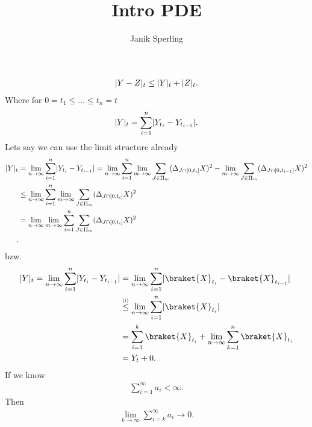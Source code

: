 \documentclass[a4paper]{report}
\title{Intro PDE}
\author{Janik Sperling}
\begin{document}
% 
% 
% 
% 
% 
% 
\begin{align*}
  \lvert Y-Z\rvert_t \le  \lvert Y\rvert_t + \lvert Z\rvert_t
.\end{align*}
Where  for $0 = t_{1}\le \ldots \le t_{n} = t$
\begin{align*}
  \lvert Y\rvert_t = \sum_{i=1}^{n}  \lvert Y_{t_i} - Y_{t_{i-1}}\rvert
.\end{align*}
Lets say we can use the limit structure already
\begin{align*} 
  \abs{Y}_t &= \lim_{n \to \infty}\sum_{i=1}^{n}  \abs{Y_{t_i} - Y_{t_{i-1}}} = \lim_{n \to \infty} \sum_{i=1}^{n} \lim_{m\to \infty} \sum_{J \in  \Pi_m} (\Delta_{J \cap [0,t_i]} X)^2 -  \lim_{m\to \infty} \sum_{J \in  \Pi_m} (\Delta_{J \cap [0,t_{i-1}]} X)^2\\
            &\le  \lim_{n \to \infty} \sum_{i=1}^{n} \lim_{m\to \infty} \sum_{J \in  \Pi_m} (\Delta_{J \cap [0,t_i]} X)^2 \\
            &=  \lim_{n \to \infty} \lim_{m\to \infty}\sum_{i=1}^{n}  \sum_{J \in  \Pi_m} (\Delta_{J \cap [0,t_i]} X)^2 \\
.\end{align*}
bzw. 
\begin{align*}
  \abs{Y}_t  = \lim_{n\to \infty} \sum_{i=1}^{n} \abs{Y_{t_i}-Y_{t_{i-1}}}  &=  \lim_{n\to \infty} \sum_{i=1}^{n} \abs{\braket{X}_{t_i} - \braket{X}_{t_{i-1}}}\\
                                                                            &\myS{(i)}{\le } \lim_{n\to \infty} \sum_{i=1}^{n} \abs{\braket{X}_{t_i}}\\ 
                                                                            &= \sum_{i=1}^{k} \braket{X}_{t_i} + \lim_{n \to \infty}  \sum_{k=1}^{n} \braket{X}_{t_i} \\
                                                                            &= Y_t + 0
.\end{align*}
If we know 
\begin{align*}
  \sum_{i=1}^{\infty} a_i < \infty 
.\end{align*}
Then 
\begin{align*}
  \lim_{k\to \infty} \sum_{i=k}^{\infty} a_i \to 0 
.\end{align*}
\end{document}
